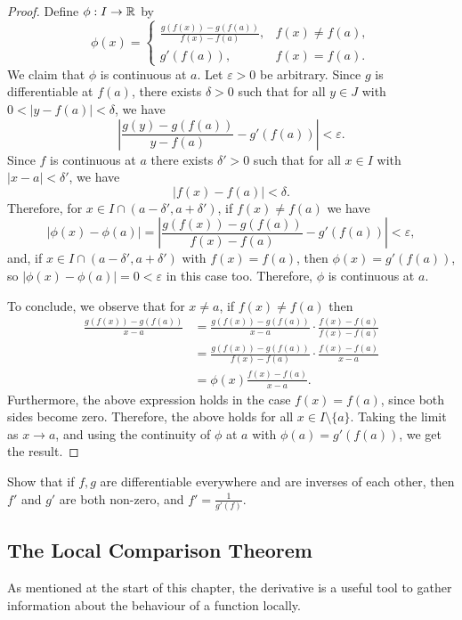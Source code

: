 \documentclass[../analysis1.tex]{subfiles}
\begin{document}
\begin{proof}
    Define $\phi:I\to\mathbb{R}$ by
    \[\phi(x)=\begin{cases}
        \frac{g(f(x))-g(f(a))}{f(x)-f(a)},& f(x)\ne f(a),\\
        g'(f(a)),& f(x)=f(a).
    \end{cases}\]
    We claim that $\phi$ is continuous at $a$. Let $\varepsilon>0$ be arbitrary. Since $g$ is differentiable at $f(a)$, there exists $\delta>0$ such that for all $y\in J$ with $0<|y-f(a)|<\delta$, we have
    \[\left|\frac{g(y)-g(f(a))}{y-f(a)}-g'(f(a))\right|<\varepsilon.\]
    Since $f$ is continuous at $a$ there exists $\delta'>0$ such that for all $x\in I$ with $|x-a|<\delta'$, we have
    \[|f(x)-f(a)|<\delta.\]
    Therefore, for $x\in I\cap (a-\delta',a+\delta')$, if $f(x)\ne f(a)$ we have
    \[\left|\phi(x)-\phi(a)\right|=\left|\frac{g(f(x))-g(f(a))}{f(x)-f(a)}-g'(f(a))\right|<\varepsilon,\]
    and, if $\allowbreak x\in I\cap (a-\delta',a+\delta')$ with $f(x)=f(a)$, then $\allowbreak\phi(x)=g'(f(a))$, so $\allowbreak|\phi(x)-\phi(a)|=0<\varepsilon$ in this case too. Therefore, $\phi$ is continuous at $a$.

    To conclude, we observe that for $x\ne a$, if $f(x)\ne f(a)$ then
    \begin{align*}
        \frac{g(f(x))-g(f(a))}{x-a}&=\frac{g(f(x))-g(f(a))}{x-a}\cdot \frac{f(x)-f(a)}{f(x)-f(a)}\\
        &=\frac{g(f(x))-g(f(a))}{f(x)-f(a)}\cdot \frac{f(x)-f(a)}{x-a}\\
        &=\phi(x)\frac{f(x)-f(a)}{x-a}.
    \end{align*}
    Furthermore, the above expression holds in the case $f(x)=f(a)$, since both sides become zero. Therefore, the above holds for all $x \in I\setminus\{a\}$. Taking the limit as $x\to a$, and using the continuity of $\phi$ at $a$ with $\phi(a)=g'(f(a))$, we get the result.\qedhere
\end{proof}


\begin{exercise*}
    Show that if $f,g$ are differentiable everywhere and are inverses of each other, then $f'$ and $g'$ are both non-zero, and $f'=\frac{1}{g'(f)}$.
\end{exercise*}

\subsection{The Local Comparison Theorem}
As mentioned at the start of this chapter, the derivative is a useful tool to gather information about the behaviour of a function locally.
\end{document}
